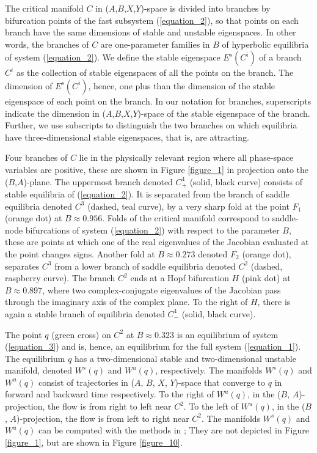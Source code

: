 \documentclass{ws-ijbc}
\begin{document}
The critical manifold $C$ in ($A$,$B$,$X$,$Y$)-space is divided into branches by bifurcation points of the fast subsystem (\ref{equation_2}), so that points on each branch have the same dimensions of stable and unstable eigenspaces.  In other words, the branches of $C$ are one-parameter families in $B$ of hyperbolic equilibria of system (\ref{equation_2}).  We define the stable eigenspace $E^s(C^i)$ of a branch $C^i$ as the collection of stable eigenspaces of all the points on the branch.  The dimension of $E^s(C^i)$, hence, one plus than the dimension of the stable eigenspace of each point on the branch.  In our notation for branches, superscripts indicate the dimension in ($A$,$B$,$X$,$Y$)-space of the stable eigenspace of the branch.  Further, we use subscripts to distinguish the two branches on which equilibria have three-dimensional stable eigenspaces, that is, are attracting.  

Four branches of $C$ lie in the physically relevant region where all phase-space variables are positive, these are shown in Figure \ref{figure_1} in projection onto the ($B$,$A$)-plane.  The uppermost branch denoted $C^4_+$ (solid, black curve) consists of stable equilibria of (\ref{equation_2}).  It is separated from the branch of saddle equilibria denoted $C^3$ (dashed, teal curve), by a very sharp fold at the point $F_1$ (orange dot) at $B \approx 0.956$.  Folds of the critical manifold correspond to saddle-node bifurcations of system (\ref{equation_2}) with respect to the parameter $B$, these are points at which one of the real eigenvalues of the Jacobian evaluated at the point changes signs.  Another fold at $B \approx 0.273$ denoted $F_2$ (orange dot), separates $C^3$ from a lower branch of saddle equilibria denoted $C^2$ (dashed, raspberry curve).   The branch $C^2$ ends at a Hopf bifurcation $H$ (pink dot) at $B \approx 0.897$, where two complex-conjugate eigenvalues of the Jacobian pass through the imaginary axis of the complex plane.  To the right of $H$, there is again a stable branch of equilibria denoted $C^4_-$ (solid, black curve).

The point $q$ (green cross) on $C^2$ at $B \approx 0.323$ is an equilibrium of system (\ref{equation_3}) and is, hence, an equilibrium for the full system (\ref{equation_1}).  The equilibrium $q$ has a two-dimensional stable and two-dimensional unstable manifold, denoted $W^s(q)$ and $W^u(q)$, respectively.  The manifolds $W^{s}(q)$ and $W^{u}(q)$ consist of trajectories in ($A$, $B$, $X$, $Y$)-space that converge to $q$ in forward and backward time respectively.  To the right of $W^u(q)$, in the ($B$, $A$)-projection, the flow is from right to left near $C^2$.  To the left of $W^u(q)$, in the ($B$, $A$)-projection, the flow is from left to right near $C^2$.  The manifolds $W^{s}(q)$ and $W^{u}(q)$ can be computed with the methods in \cite{Red_book}; They are not depicted in Figure \ref{figure_1}, but are shown in Figure \ref{figure_10}.
\end{document}
